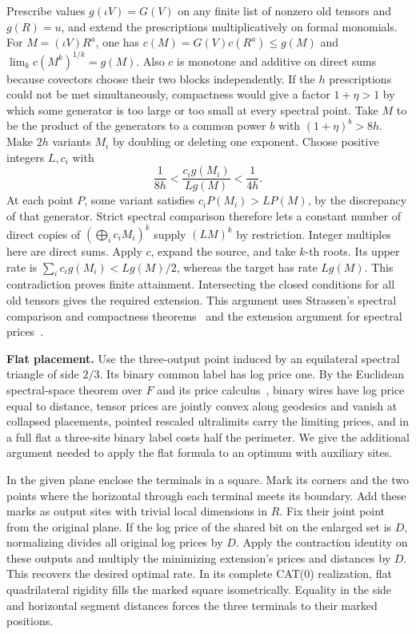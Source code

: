 \documentclass[11pt,letterpaper]{article}
\begin{document}
Prescribe values \(g(\iota V)=G(V)\) on any finite list of nonzero old tensors and \(g(R)=u\), and extend the prescriptions multiplicatively on formal monomials. For \(M=(\iota V)R^a\), one has \(c(M)=G(V)c(R^a)\le g(M)\) and \(\lim_k c(M^k)^{1/k}=g(M)\). Also \(c\) is monotone and additive on direct sums because covectors choose their two blocks independently. If the \(h\) prescriptions could not be met simultaneously, compactness would give a factor \(1+\eta>1\) by which some generator is too large or too small at every spectral point. Take \(M\) to be the product of the generators to a common power \(b\) with \((1+\eta)^b>8h\). Make \(2h\) variants \(M_i\) by doubling or deleting one exponent. Choose positive integers \(L,c_i\) with
\[
              \frac1{8h}<\frac{c_i g(M_i)}{L g(M)}<\frac1{4h}.
\]
At each point \(P\), some variant satisfies \(c_i P(M_i)>L P(M)\), by the discrepancy of that generator. Strict spectral comparison therefore lets a constant number of direct copies of \((\bigoplus_i c_i M_i)^k\) supply \((L M)^k\) by restriction. Integer multiples here are direct sums. Apply \(c\), expand the source, and take \(k\)-th roots. Its upper rate is \(\sum_i c_i g(M_i)< Lg(M)/2\), whereas the target has rate \(Lg(M)\). This contradiction proves finite attainment. Intersecting the closed conditions for all old tensors gives the required extension. This argument uses Strassen's spectral comparison and compactness theorems~\cite{strassen-spectrum} and the extension argument for spectral prices~\cite[Sections~2--3]{euclid}.

\textbf{Flat placement.} Use the three-output point induced by an equilateral spectral triangle of side \(2/3\). Its binary common label has log price one. By the Euclidean spectral-space theorem over \(F\) and its price calculus~\cite[Theorem~1.1 and Sections~2--5]{euclid}, binary wires have log price equal to distance, tensor prices are jointly convex along geodesics and vanish at collapsed placements, pointed rescaled ultralimits carry the limiting prices, and in a full flat a three-site binary label costs half the perimeter. We give the additional argument needed to apply the flat formula to an optimum with auxiliary sites.

In the given plane enclose the terminals in a square. Mark its corners and the two points where the horizontal through each terminal meets its boundary. Add these marks as output sites with trivial local dimensions in \(R\). Fix their joint point from the original plane. If the log price of the shared bit on the enlarged set is \(D\), normalizing divides all original log prices by \(D\). Apply the contraction identity on these outputs and multiply the minimizing extension's prices and distances by \(D\). This recovers the desired optimal rate. In its complete CAT(0) realization, flat quadrilateral rigidity fills the marked square isometrically. Equality in the side and horizontal segment distances forces the three terminals to their marked positions.
\end{document}
